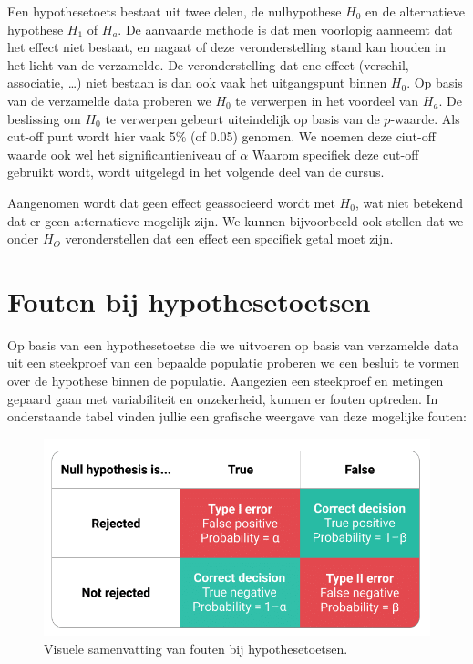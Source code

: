 \documentclass[
]{book}
\newenvironment{Shaded}{\begin{snugshade}}{\end{snugshade}}
\newcommand{\DataTypeTok}[1]{\textcolor[rgb]{0.13,0.29,0.53}{#1}}
\newcommand{\KeywordTok}[1]{\textcolor[rgb]{0.13,0.29,0.53}{\textbf{#1}}}
\newcommand{\NormalTok}[1]{#1}
\newcommand{\OperatorTok}[1]{\textcolor[rgb]{0.81,0.36,0.00}{\textbf{#1}}}
\newcommand{\OtherTok}[1]{\textcolor[rgb]{0.56,0.35,0.01}{#1}}
\theoremstyle{definition}
\theoremstyle{definition}
\theoremstyle{definition}
\theoremstyle{definition}
\theoremstyle{remark}
\begin{document}
Een hypothesetoets bestaat uit twee delen, de nulhypothese \(H_0\) en de alternatieve hypothese \(H_1\) of \(H_a\). De aanvaarde methode is dat men voorlopig aanneemt dat het effect niet bestaat, en nagaat of deze veronderstelling stand kan houden in het licht van de verzamelde. De veronderstelling dat ene effect (verschil, associatie, \ldots) niet bestaan is dan ook vaak het uitgangspunt binnen \(H_0\). Op basis van de verzamelde data proberen we \(H_0\) te verwerpen in het voordeel van \(H_a\). De beslissing om \(H_0\) te verwerpen gebeurt uiteindelijk op basis van de \(p\)-waarde. Als cut-off punt wordt hier vaak 5\% (of 0.05) genomen. We noemen deze ciut-off waarde ook wel het significantieniveau of \(\alpha\) Waarom specifiek deze cut-off gebruikt wordt, wordt uitgelegd in het volgende deel van de cursus.

Aangenomen wordt dat geen effect geassocieerd wordt met \(H_0\), wat niet betekend dat er geen a:ternatieve mogelijk zijn. We kunnen bijvoorbeeld ook stellen dat we onder \(H_O\) veronderstellen dat een effect een specifiek getal moet zijn.

\hypertarget{fouten-bij-hypothesetoetsen}{%
\section*{Fouten bij hypothesetoetsen}\label{fouten-bij-hypothesetoetsen}}


Op basis van een hypothesetoetse die we uitvoeren op basis van verzamelde data uit een steekproef van een bepaalde populatie proberen we een besluit te vormen over de hypothese binnen de populatie. Aangezien een steekproef en metingen gepaard gaan met variabiliteit en onzekerheid, kunnen er fouten optreden. In onderstaande tabel vinden jullie een grafische weergave van deze mogelijke fouten:

\begin{Shaded}
\end{Shaded}

\begin{figure}
\includegraphics[width=0.9\linewidth]{img/error} \caption{Visuele samenvatting van fouten bij hypothesetoetsen.}\label{fig:error}
\end{figure}
\end{document}
